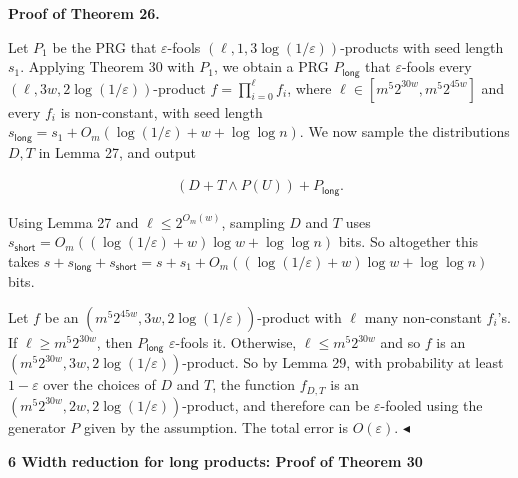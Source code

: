 \documentclass[10pt,a4paper]{article}
\begin{document}
\par\medskip\noindent\textbf{Proof of Theorem 26.}\par




Let $P_{1}$ be the PRG that $\varepsilon$-fools $(\ell,1,3\log(1/\varepsilon))$-products with seed length $s_{1}$.
Applying Theorem 30 with $P_{1}$, we obtain a PRG $P_{\mathsf{long}}$ that $\varepsilon$-fools every $(\ell,3w,2\log(1/\varepsilon))$-product $f=\prod_{i=0}^{\ell}f_{i}$, where $\ell\in[m^{5}2^{30w},m^{5}2^{45w}]$ and every $f_{i}$ is non-constant, with seed length $s_{\mathsf{long}}=s_{1}+O_{m}(\log(1/\varepsilon)+w+\log\log n)$.
We now sample the distributions $D,T$ in Lemma 27, and output\par


\[\begin{gathered}
(D+T\wedge P(U))+P_{\mathsf{long}}.
\end{gathered}\]


Using Lemma 27 and $\ell\leq 2^{O_{m}(w)}$, sampling $D$ and $T$ uses $s_{\mathsf{short}}=O_{m}((\log(1/\varepsilon)+w)\log w+\log\log n)$ bits.
So altogether this takes $s+s_{\mathsf{long}}+s_{\mathsf{short}}=s+s_{1}+O_{m}((\log(1/\varepsilon)+w)\log w+\log\log n)$ bits.\par




Let $f$ be an $(m^{5}2^{45w},3w,2\log(1/\varepsilon))$-product with $\ell$ many non-constant $f_{i}$’s.
If $\ell\geq m^{5}2^{30w}$, then $P_{\mathsf{long}}$ $\varepsilon$-fools it.
Otherwise, $\ell\leq m^{5}2^{30w}$ and so $f$ is an $(m^{5}2^{30w},3w,2\log(1/\varepsilon))$-product.
So by Lemma 29, with probability at least $1-\varepsilon$ over the choices of $D$ and $T$, the function $f_{D,T}$ is an $(m^{5}2^{30w},2w,2\log(1/\varepsilon))$-product, and therefore can be $\varepsilon$-fooled using the generator $P$ given by the assumption.
The total error is $O(\varepsilon)$.
$\blacktriangleleft$\par







\par\medskip\noindent\textbf{
6 Width reduction for long products: Proof of Theorem 30
}\par
\end{document}
